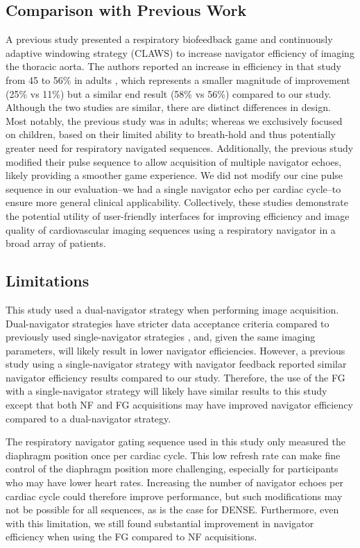 	\subsection{Comparison with Previous Work}
		A previous study presented a respiratory biofeedback game and continuously adaptive windowing strategy (CLAWS) to increase navigator efficiency of imaging the thoracic aorta. The authors reported an increase in efficiency in that study from 45 to 56\% in adults \cite{Jhooti2011}, which represents a smaller magnitude of improvement (25\% vs 11\%) but a similar end result (58\% vs 56\%) compared to our study. Although the two studies are similar, there are distinct differences in design. Most notably, the previous study was in adults; whereas we exclusively focused on children, based on their limited ability to breath-hold and thus potentially greater need for respiratory navigated sequences. Additionally, the previous study modified their pulse sequence to allow acquisition of multiple navigator echoes, likely providing a smoother game experience. We did not modify our cine pulse sequence in our evaluation--we had a single navigator echo per cardiac cycle--to ensure more general clinical applicability. Collectively, these studies demonstrate the potential utility of user-friendly interfaces for improving efficiency and image quality of cardiovascular imaging sequences using a respiratory navigator in a broad array of patients.
	
	\subsection{Limitations}
		This study used a dual-navigator strategy when performing image acquisition. Dual-navigator strategies have stricter data acceptance criteria compared to previously used single-navigator strategies \cite{Zhong2010a}, and, given the same imaging parameters, will likely result in lower navigator efficiencies. However, a previous study using a single-navigator strategy with navigator feedback reported similar navigator efficiency results compared to our study. Therefore, the use of the FG with a single-navigator strategy will likely have similar results to this study except that both NF and FG acquisitions may have improved navigator efficiency compared to a dual-navigator strategy.
		
		The respiratory navigator gating sequence used in this study only measured the diaphragm position once per cardiac cycle. This low refresh rate can make fine control of the diaphragm position more challenging, especially for participants who may have lower heart rates. Increasing the number of navigator echoes per cardiac cycle could therefore improve performance, but such modifications may not be possible for all sequences, as is the case for DENSE. Furthermore, even with this limitation, we still found substantial improvement in navigator efficiency when using the FG compared to NF acquisitions.
		
